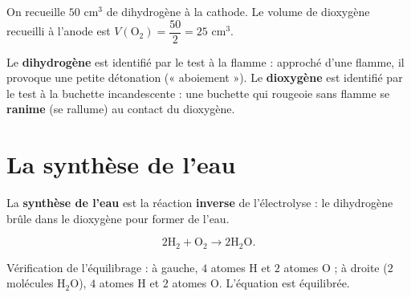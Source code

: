 \begin{exemple}
On recueille $50$ cm$^{3}$ de dihydrogène à la cathode. Le volume de dioxygène recueilli à
l'anode est $V(\mathrm{O_2})=\dfrac{50}{2}=25$ cm$^{3}$.
\end{exemple}

\begin{propriete}
Le \textbf{dihydrogène} est identifié par le test à la flamme : approché d'une flamme, il
provoque une petite détonation (« aboiement »). Le \textbf{dioxygène} est identifié par le
test à la buchette incandescente : une buchette qui rougeoie sans flamme se
\textbf{ranime} (se rallume) au contact du dioxygène.
\end{propriete}

\section{La synthèse de l'eau}

\begin{definition}
La \textbf{synthèse de l'eau} est la réaction \textbf{inverse} de l'électrolyse : le
dihydrogène brûle dans le dioxygène pour former de l'eau.
\end{definition}

\begin{propriete}
\[
2\mathrm{H_2}+\mathrm{O_2}\longrightarrow2\mathrm{H_2O}.
\]
\end{propriete}

\begin{illus}
\end{illus}

\begin{exemple}
Vérification de l'équilibrage : à gauche, $4$ atomes H et $2$ atomes O ; à droite ($2$
molécules $\mathrm{H_2O}$), $4$ atomes H et $2$ atomes O. L'équation est équilibrée.
\end{exemple}

